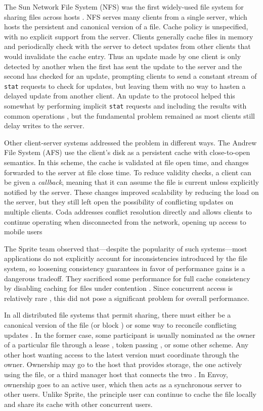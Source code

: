 The Sun Network File System (NFS) was the first widely-used file system for sharing files across hosts \cite{sandberg}. NFS serves many clients from a single server, which hosts the persistent and canonical version of a file. Cache policy is unspecified, with no explicit support from the server. Clients generally cache files in memory and periodically check with the server to detect updates from other clients that would invalidate the cache entry. Thus an update made by one client is only detected by another when the first has sent the update to the server and the second has checked for an update, prompting clients to send a constant stream of \texttt{stat} requests to check for updates, but leaving them with no way to hasten a delayed update from another client. An update to the protocol helped this somewhat by performing implicit \texttt{stat} requests and including the results with common operations \cite{pawlowski,callaghan}, but the fundamental problem remained as most clients still delay writes to the server.

Other client-server systems addressed the problem in different ways. The Andrew File System (AFS) \cite{satyanarayanan85,howard} use the client's disk as a persistent cache with close-to-open semantics. In this scheme, the cache is validated at file open time, and changes forwarded to the server at file close time. To reduce validity checks, a client can be given a \emph{callback}, meaning that it can assume the file is current unless explicitly notified by the server. These changes improved scalability by reducing the load on the server, but they still left open the possibility of conflicting updates on multiple clients. Coda addresses conflict resolution directly and allows clients to continue operating when disconnected from the network, opening up access to mobile users \cite{satyanarayanan90,mummert}

The Sprite team observed that---despite the popularity of such systems---most applications do not explicitly account for inconsistencies introduced by the file system, so loosening consistency guarantees in favor of performance gains is a dangerous tradeoff. They sacrificed some performance for full cache consistency by disabling caching for files under contention \cite{baker91,nelson,welch}. Since concurrent access is relatively rare \cite{kistler}, this did not pose a significant problem for overall performance.

In all distributed file systems that permit sharing, there must either be a canonical version of the file (or block \cite{mcgregor}) or some way to reconcile conflicting updates \cite{kistler}. In the former case, some participant is usually nominated as the owner of a particular file through a lease \cite{gray89}, token passing \cite{burrows,mann}, or some other scheme. Any other host wanting access to the latest version must coordinate through the owner. Ownership may go to the host that provides storage, the one actively using the file, or a third manager host that connects the two \cite{blaze,keleher}. In Envoy, ownership goes to an active user, which then acts as a synchronous server to other users. Unlike Sprite, the principle user can continue to cache the file locally and share its cache with other concurrent users.

